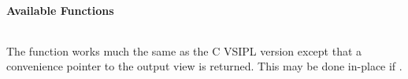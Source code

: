 \cvsiplh
\newline \hspace*{.8cm} \vspace*{.1cm} \textbf{Available Functions }
\newline \hspace*{1.1cm} {
\ttfamily
\begin{tabular}[H]{l}
\end{tabular}
}
\pyjvsiph
{}
\newline\hspace*{1.2cm}\parbox{10.8cm}{\vspace*{.1cm}The  function works much the same as the C VSIPL version except that a convenience pointer to the output view is returned. This may be done in-place if .}
